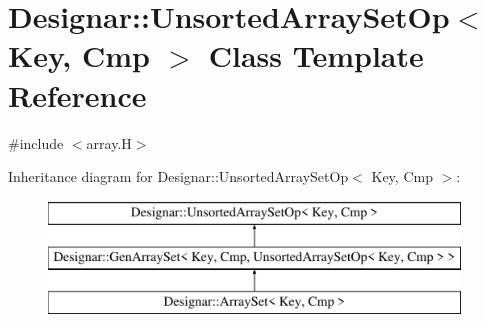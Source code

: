 \hypertarget{class_designar_1_1_unsorted_array_set_op}{}\section{Designar\+:\+:Unsorted\+Array\+Set\+Op$<$ Key, Cmp $>$ Class Template Reference}
\label{class_designar_1_1_unsorted_array_set_op}


{\ttfamily \#include $<$array.\+H$>$}

Inheritance diagram for Designar\+:\+:Unsorted\+Array\+Set\+Op$<$ Key, Cmp $>$\+:\begin{figure}[H]
\begin{center}
\leavevmode
\includegraphics[height=3.000000cm]{class_designar_1_1_unsorted_array_set_op}
\end{center}
\end{figure}
